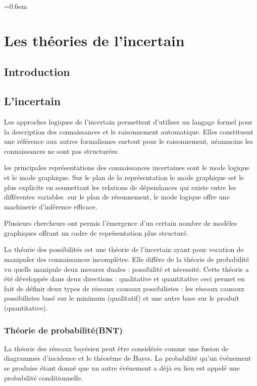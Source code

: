 \parskip=0.6em
\chapter{Les théories de l'incertain}

{}
\section*{Introduction}



\section{L’incertain}

Les approches logiques de l’incertain permettent d’utiliser un langage formel pour la description des connaissances et le raisonnement automatique. Elles constituent une référence aux autres formalismes surtout pour le raisonnement, néanmoins les connaissances ne  sont pas structurées.

les principales représentations des connaissances incertaines sont le mode logique et le mode graphique.
Sur le plan de la représentation le mode graphique est le plus explicite en soumettant les relations de dépendances qui existe entre les différentes variables .sur le plan de résonnement, le mode logique offre une machinerie d’inférence efficace.

Plusieurs chercheurs ont permis l’émergence d’un certain nombre de modèles graphiques offrant un cadre de représentation plus structuré.

La théorie des possibilités est une théorie de l’incertain ayant pour vocation de manipuler des connaissances incomplètes. Elle diffère de la théorie de probabilité  vu quelle manipule deux mesures duales : possibilité et nécessité. Cette théorie a été développée dans deux directions : qualitative et quantitative ceci permet en fait de définir deux types de réseaux causaux possibilistes : les réseaux causaux possibilistes basé sur le minimum (qualitatif) et une autre base sur le produit (quantitative).



\subsection{Théorie de probabilité(BNT)}

La théorie des réseaux bayésien peut être considérée comme une fusion de diagrammes d'incidence et le théorème de Bayes. La probabilité qu'un événement se produise étant donné que un autre événement a déjà eu lieu est appelé une probabilité conditionnelle. 


